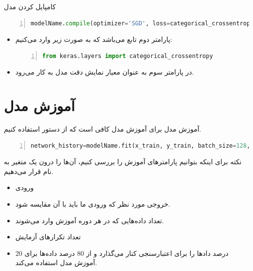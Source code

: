 \documentclass[10pt,xcolor=dvipsnames,professionalfont]{beamer}
\begin{document}
\begin{frame}[fragile]{کامپایل کردن مدل}
\begin{latin}
\begin{lstlisting}[language=Python,frame=single,rulecolor=\color{magenta},numbers=left,numberstyle=\tiny]
modelName.compile(optimizer='SGD', loss=categorical_crossentropy, metric=[`accuracy`])
\end{lstlisting}
\end{latin}
\begin{itemize}
\item
پارامتر دوم تابع  می‌باشد که به صورت زیر وارد  می‌کنیم:
\begin{latin}
\begin{lstlisting}[language=Python,frame=single,rulecolor=\color{magenta},numbers=left,numberstyle=\tiny]
from keras.layers import categorical_crossentropy
\end{lstlisting}
\end{latin}
\item
در پارامتر سوم  به عنوان معیار نمایش دقت مدل به کار می‌رود.
\end{itemize}

\end{frame}

\section{آموزش مدل}
\begin{frame}[fragile]{آموزش مدل}
برای آموزش مدل کافی است که از دستور  استفاده کنیم.
\begin{latin}
\begin{lstlisting}[language=Python,frame=single,rulecolor=\color{magenta},numbers=left,numberstyle=\tiny]
network_history=modelName.fit(x_train, y_train, batch_size=128, epoches=2, validation_split=0.2)
\end{lstlisting}
\end{latin}
\vspace{-0.3cm}
\begin{block}{نکته}
برای اینکه بتوانیم پارامترهای آموزش را بررسی کنیم، آن‌ها را درون یک متغیر به نام  قرار می‌دهیم.
\end{block}
\begin{itemize}
\item
{} ورودی
\item
{} خروجی مورد نظر که ورودی ما باید با آن مقایسه شود.
\item
{} تعداد داده‌هایی که در هر دوره آموزش وارد می‌شوند.
\item
{} تعداد تکرارهای آزمایش
\item
{} 20 درصد داد‌ها را برای اعتبارسنجی کنار می‌گذارد و از 80 درصد داده‌ها برای آموزش مدل استفاده می‌کند.
\end{itemize}

\end{frame}
\end{document}
